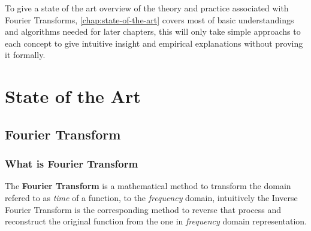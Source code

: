 \documentclass[
  oneside,
  11pt, a4paper,
  footinclude=true,
  headinclude=true,
  cleardoublepage=empty
]{scrbook}
\begin{document}
To give a state of the art overview of the theory and practice associated with Fourier Transforms, \autoref{chap:state-of-the-art} covers most of basic understandings and algorithms needed for later chapters, this will only take simple approachs to each concept to give intuitive insight and empirical explanations without proving it formally.






\chapter{State of the Art} \label{chap:state-of-the-art}

\section{Fourier Transform} \label{sec:fourier-transform}

\subsection{What is Fourier Transform} \label{subsec:what-is-fourier-transform}

The \textbf{Fourier Transform} is a mathematical method to transform the domain refered to as \textit{time} of a function, to the \textit{frequency} domain, intuitively the Inverse Fourier Transform is the corresponding method to reverse that process and reconstruct the original function from the one in \textit{frequency} domain representation.
\end{document}
